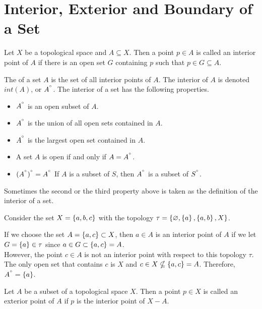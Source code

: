 \documentclass[../main-sheet.tex]{subfiles}
\begin{document}
\section{Interior, Exterior and Boundary of a Set}
\begin{defn}
    Let  \(X\) be a topological space and  \(A \subseteq X\). Then a point  \(p \in A\) is called an interior point of  \(A\) if there is an open set  \(G\) containing  \(p\) such that  \(p \in G \subseteq A\).
\end{defn}
\begin{defn}
    The  of a set  \(A\) is the set of all interior
    points of  \(A\). The interior of  \(A\) is denoted  \(int(A)\), or  \(A^{\degree}\). The
    interior of a set has the following properties.
    \begin{itemize}
        \item  \(A^{\degree}\) is an open subset of  \(A\).
        \item  \(A^{\degree}\) is the union of all open sets contained in  \(A\).
        \item  \(A^{\degree}\) is the largest open set contained in  \(A\).
        \item A set  \(A\) is open if and only if  \(A= A^{\degree}\).
        \item  \((A^{\degree})^{\degree}=A^{\degree}\) If  \(A\) is a subset of  \(S\), then  \(A^{\degree}\) is a subset of  \(S^{\degree}\).
    \end{itemize}
\end{defn}
Sometimes the second or the third property above is taken as
the definition of the interior of a set.
\begin{ex}
    Consider the set  \(X = \left\{a, b,c\right\}\) with the topology
     \(\tau = \left\{\varnothing,\left\{a\right\}, \left\{a, b\right\}, X\right\}\).


    If we choose the set  \(A = \left\{a,c\right\} \subset X\), then  \(a \in A\) is an interior
    point of  \(A\) if we let  \(G = \left\{a\right\} \in \tau\) since  \(a \in G \subset \left\{a,c\right\} = A\).\\
    However, the point  \(c \in A\) is not an interior point with respect to
    this topology  \(\tau\). The only open set that contains  \(c\) is  \(X\) and
     \(c\in X\nsubseteq \left\{a,c\right\}= A\). Therefore,  \(A^{\degree}= \left\{a\right\}\).
\end{ex}
\begin{defn}
    Let  \(A\) be a subset of a
    topological space  \(X\). Then a point  \(p\in X\) is called an exterior
    point of  \(A\) if  \(p\) is the interior point of  \(X- A\).
\end{defn}
\end{document}
